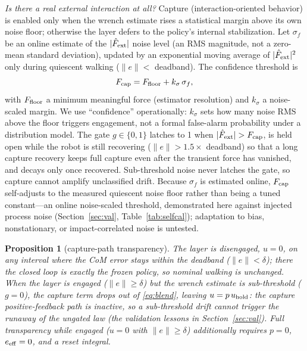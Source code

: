 \documentclass[journal]{IEEEtran}
\newtheorem{proposition}{Proposition}
\begin{document}
\emph{Is there a real external interaction at all?} Capture (interaction-oriented behavior) is enabled only when the wrench estimate rises a statistical margin above its own noise floor; otherwise the layer defers to the policy's internal stabilization. Let $\sigma_f$ be an online estimate of the $|\hat F_{\rm ext}|$ noise level (an RMS magnitude, not a zero-mean standard deviation), updated by an exponential moving average of $|\hat F_{\rm ext}|^2$ only during quiescent walking ($\|e\|<$ deadband). The confidence threshold is
\begin{equation}
F_{\rm cap}=F_{\rm floor}+k_\sigma\,\sigma_f,
\label{eq:fcap}
\end{equation}
with $F_{\rm floor}$ a minimum meaningful force (estimator resolution) and $k_\sigma$ a noise-scaled margin. We use ``confidence'' operationally: $k_\sigma$ sets how many noise RMS above the floor triggers engagement, not a formal false-alarm probability under a distribution model. The gate $g\in\{0,1\}$ latches to 1 when $|\hat F_{\rm ext}|>F_{\rm cap}$, is held open while the robot is still recovering ($\|e\|>1.5\times$ deadband) so that a long capture recovery keeps full capture even after the transient force has vanished, and decays only once recovered. Sub-threshold noise never latches the gate, so capture cannot amplify unclassified drift. Because $\sigma_f$ is estimated online, $F_{\rm cap}$ self-adjusts to the measured quiescent noise floor rather than being a tuned constant---an online noise-scaled threshold, demonstrated here against injected process noise (Section~\ref{sec:val}, Table~\ref{tab:selfcal}); adaptation to bias, nonstationary, or impact-correlated noise is untested.

\begin{proposition}[capture-path transparency]
\label{prop:gate}
The layer is disengaged, $u=0$, on any interval where the CoM error stays within the deadband ($\|e\|<\delta$); there the closed loop is exactly the frozen policy, so nominal walking is unchanged. When the layer is engaged ($\|e\|\ge\delta$) but the wrench estimate is sub-threshold ($g=0$), the capture term drops out of \eqref{eq:blend}, leaving $u=p\,u_{\rm hold}$: the capture positive-feedback path is inactive, so a sub-threshold drift cannot trigger the runaway of the ungated law (the validation lessons in Section~\ref{sec:val}). Full transparency while engaged ($u=0$ with $\|e\|\ge\delta$) additionally requires $p=0$, $e_{\rm eff}=0$, and a reset integral.
\end{proposition}
\end{document}
